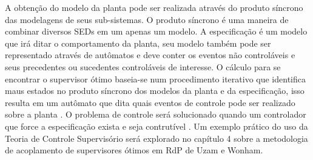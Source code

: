 A obten\c{c}\~ao do modelo da planta pode ser realizada atrav\'es do produto s\'incrono das modelagens de seus sub-sistemas. O produto s\'incrono \'e uma maneira de combinar diversos SEDs em um apenas um modelo. A especifica\c{c}\~ao \'e um modelo que ir\'a ditar o comportamento da planta, seu modelo tamb\'em pode ser representado atrav\'es de aut\^omatos e deve conter os eventos n\~ao control\'aveis e seus precedentes ou sucedentes control\'aveis de interesse. 
O c\'alculo para se encontrar o supervisor \'otimo baseia-se num procedimento iterativo que identifica maus estados no produto s\'incrono dos modelos da planta e da especifica\c{c}\~ao, isso resulta em um aut\^omato que dita quais eventos de controle pode ser realizado sobre a planta \cite{apostilacury}.
O problema de controle ser\'a solucionado quando um controlador que force a especifica\c{c}\~ao exista e seja contrut\'ivel \cite{WonhamCai2018}. Um exemplo pr\'atico do uso da Teoria de Controle Supervis\'orio ser\'a explorado no cap\'itulo 4 sobre a metodologia de acoplamento de supervisores \'otimos em RdP de Uzam e Wonham.

